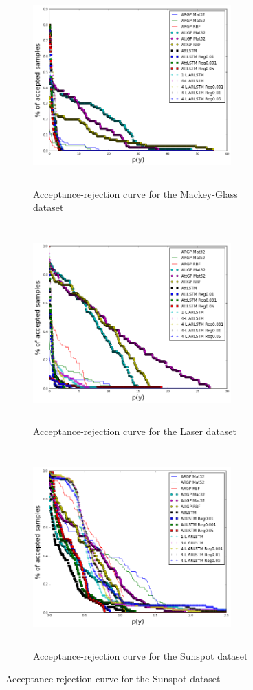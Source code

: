 \documentclass[pdftex,10pt,a4paper,journal]{article}
\theoremstyle{definition}
\theoremstyle{remark}
\begin{document}
\begin{multicols}{2}
\begin{figure}[ht] 
    \centering
    \begin{subfigure}[t]{0.5\textwidth}
        \centering
        \includegraphics[height=3in, width=3in]{figs/accrej_mg.png}
        \caption{Acceptance-rejection curve for the Mackey-Glass dataset}
    \end{subfigure}%
    
    \begin{subfigure}[t]{0.5\textwidth}
        \centering
        \includegraphics[height=3in, width=3in]{figs/accrej_laser.png}
        \caption{Acceptance-rejection curve for the Laser dataset}
    \end{subfigure}
    
    \begin{subfigure}[t]{0.5\textwidth}
        \centering
        \includegraphics[height=3in, width=3in]{figs/accrej_sunspot.png}
        \caption{Acceptance-rejection curve for the Sunspot dataset}
    \end{subfigure}%
    

\end{figure}
\end{multicols}
\end{document}
